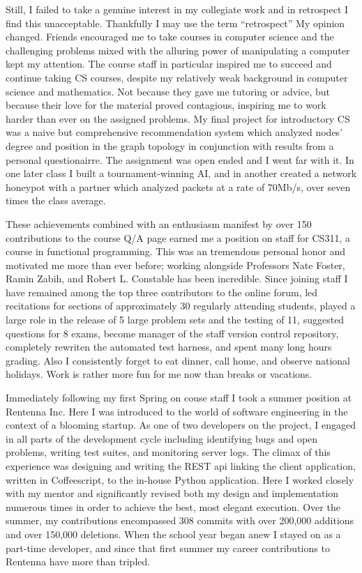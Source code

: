 \documentclass{article}
\begin{document}
Still, I failed to take a genuine interest in my collegiate work and in retrospect I find this unacceptable. 
Thankfully I may use the term ``retrospect'' 
My opinion changed.
Friends encouraged me to take courses in computer science and the challenging problems mixed with the alluring power of manipulating a computer kept my attention.
The course staff in particular inspired me to succeed and continue taking CS courses, despite my relatively weak background in computer science and mathematics.
Not because they gave me tutoring or advice, but because their love for the material proved contagious, inspiring me to work harder than ever on the assigned problems.
My final project for introductory CS was a naive but comprehensive recommendation system which analyzed nodes' degree and position in the graph topology in conjunction with results from a personal questionairre.
The assignment was open ended and I went far with it.
In one later class I built a tournament-winning AI, and in another created a network honeypot with a partner which analyzed packets at a rate of 70Mb/s, over seven times the class average.

These achievements combined with an enthusiasm manifest by over 150 contributions to the course Q/A page earned me a position on staff for CS311, a course in functional programming. 
This was an tremendous personal honor and motivated me more than ever before; working alongside Professors Nate Foster, Ramin Zabih, and Robert L. Constable has been incredible.
Since joining staff I have remained among the top three contributors to the online forum, led recitations for sections of approximately 30 regularly attending students, played a large role in the release of 5 large problem sets and the testing of 11, suggested questions for 8 exams, become manager of the staff version control repository, completely rewriten the automated test harness, and spent many long hours grading.
Also I consistently forget to eat dinner, call home, and observe national holidays.
Work is rather more fun for me now than breaks or vacations.


Immediately following my first Spring on couse staff I took a summer position at Rentenna Inc. 
Here I was introduced to the world of software engineering in the context of a blooming startup. 
As one of two developers on the project, I engaged in all parts of the development cycle including identifying bugs and open problems, writing test suites, and monitoring server logs.
The climax of this experience was designing and writing the REST api linking the client application, written in Coffeescript, to the in-house Python application.
Here I worked closely with my mentor and significantly revised both my design and implementation numerous times in order to achieve the best, most elegant execution.
Over the summer, my contributions encompassed 308 commits with over 200,000 additions and over 150,000 deletions.
When the school year began anew I stayed on as a part-time developer, and since that first summer my career contributions to Rentenna have more than tripled.
\end{document}
